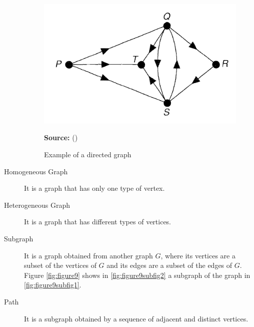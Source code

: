 \begin{description}
\begin{figure}[ht]
\centering
\caption{Example of a directed graph}
\label{fig:figure8}
\includegraphics[width=.4\textwidth]{images/directed_graph_example.png}
\par\medskip\ABNTEXfontereduzida\selectfont\textbf{Source:} \citeauthor{Tobergte2013} (\citeyear{Tobergte2013}) \par\medskip
\end{figure}

\item[Homogeneous Graph] It is a graph that has only one type of vertex.
\item[Heterogeneous Graph] It is a graph that has different types of vertices.
\item[Subgraph] It is a graph obtained from another graph $G$, where its vertices are a subset of the vertices of $G$ and its edges are a subset of the edges of $G$. Figure \ref{fig:figure9} shows in \ref{fig:figure9subfig2} a subgraph of the graph in \ref{fig:figure9subfig1}.
\item[Path] It is a subgraph obtained by a sequence of adjacent and distinct vertices.


\end{description}
